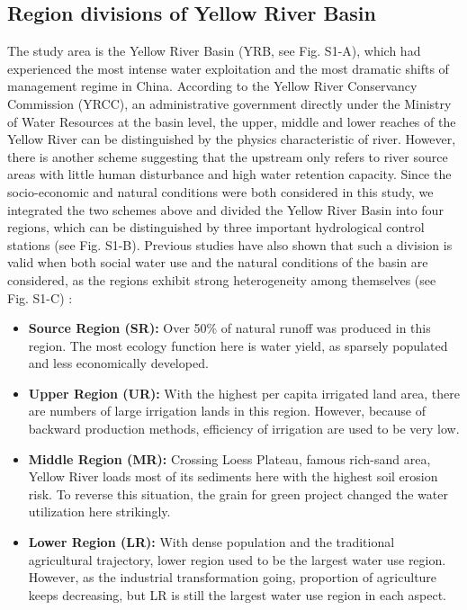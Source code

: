 \documentclass[9pt,twoside,lineno]{pnas-new}
\begin{document}
\subsection*{Region divisions of Yellow River Basin}
The study area is the Yellow River Basin (YRB, see Fig. S1-A), which had experienced the most intense water exploitation and the most dramatic shifts of management regime in China. 
According to the Yellow River Conservancy Commission (YRCC), an administrative government directly under the Ministry of Water Resources at the basin level, the upper, middle and lower reaches of the Yellow River can be distinguished by the physics characteristic of river. 
However, there is another scheme suggesting that the upstream only refers to river source areas with little human disturbance and high water retention capacity.
Since the socio-economic and natural conditions were both considered in this study, we integrated the two schemes above and divided the Yellow River Basin into four regions, which can be distinguished by three important hydrological control stations (see Fig. S1-B). 
Previous studies have also shown that such a division is valid when both social water use and the natural conditions of the basin are considered, as the regions exhibit strong heterogeneity among themselves (see Fig. S1-C) \cite{wangYellowRiverWater2019}:

\begin{itemize}
    \item \textbf{Source Region (SR):} Over 50\% of natural runoff was produced in this region. The most ecology function here is water yield, as sparsely populated and less economically developed.
    \item \textbf{Upper Region (UR):} With the highest per capita irrigated land area, there are numbers of large irrigation lands in this region. However, because of backward production methods, efficiency of irrigation are used to be very low.
    \item \textbf{Middle Region (MR):} Crossing Loess Plateau, famous rich-sand area, Yellow River loads most of its sediments here with the highest soil erosion risk. To reverse this situation, the grain for green project changed the water utilization here strikingly.
    \item \textbf{Lower Region (LR):} With dense population and the traditional agricultural trajectory, lower region used to be the largest water use region. However, as the industrial transformation going, proportion of agriculture keeps decreasing, but LR is still the largest water use region in each aspect.
\end{itemize}
\end{document}
